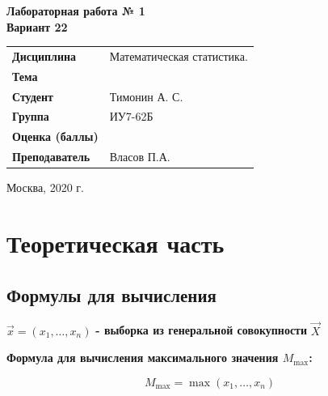 \documentclass[12pt, a4paper]{report}
\begin{document}
\begin{titlepage}
		\vspace{2cm}
		
		\begin{center}
			\textbf{Лабораторная работа № 1} \\
			\vspace{0.5cm}
			\textbf{Вариант 22}
		\end{center}
		
		\vspace{4cm}
		
		\begin{flushleft}
			\begin{tabular}{ll}
				\textbf{Дисциплина} & Математическая статистика. \\
				\textbf{Тема} & \\
				\textbf{Студент} & Тимонин А. С. \\
				\textbf{Группа} & ИУ7-62Б \\
				\textbf{Оценка (баллы)} & \\
				\textbf{Преподаватель} & Власов П.А. \\
			\end{tabular}
		\end{flushleft}
		
		\vspace{6cm}
		
		\begin{center}
			Москва, 2020 г.
		\end{center}
		
		
	\end{titlepage}
	
	
	\section{Теоретическая часть}
	\subsection{Формулы для вычисления}
	
	\hspace{0.7cm} $\vec{x} = {(x_1, \dots, x_n)}$ \textbf{- выборка из генеральной совокупности} $\vec{X}$
	
	\vspace{0.5cm}\textbf{Формула для вычисления максимального значения $M_{\max}$:}
	
	\begin{equation*} \label{Mmax}
	M_{\max} = \max{(x_1, \dots, x_n)}
	\end{equation*}
	
\end{document}
